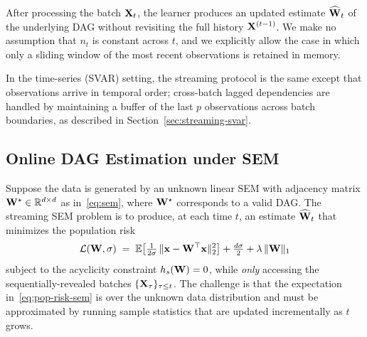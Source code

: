 \documentclass[journal,twoside]{IEEEtran}
\begin{document}
After processing the batch ${\mathbf X}_t$, the learner produces an updated
estimate $\widehat{{\mathbf W}}_t$ of the underlying DAG without revisiting the
full history ${\mathbf X}^{(t-1)}$. We make no assumption that $n_t$ is
constant across $t$, and we explicitly allow the case in which only a
sliding window of the most recent observations is retained in memory.

In the time-series (SVAR) setting, the streaming protocol is the same
except that observations arrive in temporal order; cross-batch lagged
dependencies are handled by maintaining a buffer of the last $p$
observations across batch boundaries, as described in
Section~\ref{sec:streaming-svar}.

\subsection{Online DAG Estimation under SEM}
\label{sec:problem-sem}
Suppose the data is generated by an unknown linear SEM with adjacency
matrix ${\mathbf W}^\star \in \mathbb{R}^{d \times d}$ as in~\eqref{eq:sem},
where ${\mathbf W}^\star$ corresponds to a valid DAG. The streaming SEM
problem is to produce, at each time $t$, an estimate
$\widehat{{\mathbf W}}_t$ that minimizes the population risk
\begin{equation}
\label{eq:pop-risk-sem}
\mathcal{L}({\mathbf W}, \sigma)
\;=\; \mathbb{E}\!\left[
  \tfrac{1}{2\sigma}\,\|{\mathbf x} - {\mathbf W}^\top {\ensuremath{\mathbf x}}\|_2^2
\right] + \tfrac{d \sigma}{2}
+ \lambda\,\|{\mathbf W}\|_1
\end{equation}
subject to the acyclicity constraint $h_s({\mathbf W}) = 0$, while
\emph{only} accessing the sequentially-revealed batches
$\{{\mathbf X}_\tau\}_{\tau \leq t}$. The challenge is that the
expectation in~\eqref{eq:pop-risk-sem} is over the unknown data
distribution and must be approximated by running sample statistics that
are updated incrementally as $t$ grows.
\end{document}
